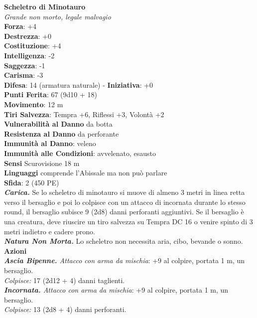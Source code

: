 \begin{multicols}{2}
\medskip\textbf{Scheletro di Minotauro}\\
\emph{Grande non morto, legale malvagio}\\
\textbf{Forza}: +4\\
\textbf{Destrezza}: +0\\
\textbf{Costituzione}: +4\\
\textbf{Intelligenza}: -2\\
\textbf{Saggezza}: -1\\
\textbf{Carisma}: -3\\
\textbf{Difesa}: 14 (armatura naturale) - \textbf{Iniziativa}: +0\\
\textbf{Punti Ferita}: 67 (9d10 + 18)\\
\textbf{Movimento}: 12 m\\
\textbf{Tiri Salvezza}: Tempra +6, Riflessi +3, Volontà +2\\
\textbf{Vulnerabilità al Danno} da botta\\
\textbf{Resistenza al Danno} da perforante\\
\textbf{Immunità al Danno}: veleno\\
\textbf{Immunità alle Condizioni}: avvelenato, esausto\\
\textbf{Sensi} Scurovisione 18 m\\
\textbf{Linguaggi} comprende l'Abissale ma non può parlare\\
\textbf{Sfida}: 2 (450 PE)\smallskip\\
\emph{\textbf{Carica.}} Se lo scheletro di minotauro si muove di almeno 3 metri in linea retta verso il bersaglio e poi lo colpisce con un attacco di incornata durante lo stesso round, il bersaglio subisce 9 (2d8) danni perforanti aggiuntivi. Se il bersaglio è una creatura, deve riuscire un tiro salvezza su Tempra DC  16 o venire spinto di 3 metri indietro e cadere prono.\\
\emph{\textbf{Natura Non Morta.}} Lo scheletro non necessita aria, cibo, bevande o sonno.\\
\smallskip\textbf{Azioni}\\
\emph{\textbf{Ascia Bipenne.} Attacco con arma da mischia}: +9 al colpire, portata 1 m, un bersaglio.\\
\emph{Colpisce:} 17 (2d12 + 4) danni taglienti.\\
\emph{\textbf{Incornata.} Attacco con arma da mischia}: +9 al colpire, portata 1 m, un bersaglio.\\
\emph{Colpisce:} 13 (2d8 + 4) danni perforanti.\\


\end{multicols}
